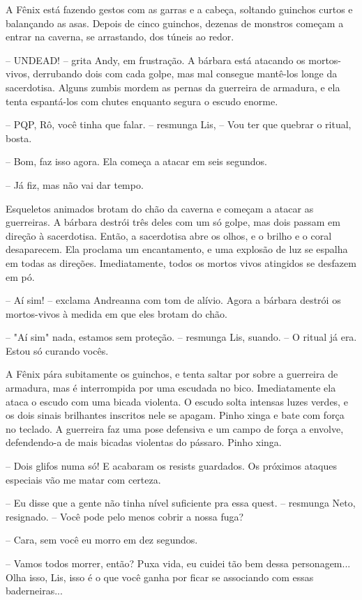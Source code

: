 A Fênix está fazendo gestos com as garras e a cabeça, soltando guinchos curtos e balançando as asas.
Depois de cinco guinchos, dezenas de monstros começam a entrar na caverna, se arrastando, dos túneis ao redor.

-- UNDEAD! -- grita Andy, em frustração. A bárbara está atacando os mortos-vivos, derrubando dois com cada golpe, 
mas mal consegue mantê-los longe da sacerdotisa. 
Alguns zumbis mordem as pernas da guerreira de armadura, e ela tenta espantá-los com chutes enquanto segura o escudo enorme.

-- PQP, Rô, você tinha que falar. -- resmunga Lis, -- Vou ter que quebrar o ritual, bosta.

-- Bom, faz isso agora. Ela começa a atacar em seis segundos.

-- Já fiz, mas não vai dar tempo.

Esqueletos animados brotam do chão da caverna e começam a atacar as guerreiras. A bárbara destrói três deles com um só golpe,
mas dois passam em direção à sacerdotisa. 
Então, a sacerdotisa abre os olhos, e o brilho e o coral
desaparecem. Ela proclama um encantamento, e uma explosão de luz se espalha em todas as direções. Imediatamente,
todos os mortos vivos atingidos se desfazem em pó.

-- Aí sim! -- exclama Andreanna com tom de alívio. Agora a bárbara destrói os mortos-vivos à medida em que eles brotam do chão.

-- "Aí sim" nada, estamos sem proteção. -- resmunga Lis, suando. -- O ritual já era. Estou só curando vocês.

A Fênix pára subitamente os guinchos, e tenta saltar por sobre a guerreira de armadura, mas é interrompida por uma escudada no bico.
Imediatamente ela ataca o escudo com uma bicada violenta. O escudo solta intensas luzes verdes, e os dois sinais
brilhantes inscritos nele se apagam. Pinho xinga e bate com força no teclado. A guerreira faz uma pose defensiva e um campo de força a envolve,
defendendo-a de mais bicadas violentas do pássaro. Pinho xinga.

-- Dois glifos numa só! E acabaram os resists guardados. Os próximos ataques especiais vão me matar com certeza.

-- Eu disse que a gente não tinha nível suficiente pra essa quest. -- resmunga Neto, resignado. -- Você pode pelo menos cobrir a nossa fuga?

-- Cara, sem você eu morro em dez segundos.

-- Vamos todos morrer, então? Puxa vida, eu cuidei tão bem dessa personagem... Olha isso, Lis, isso é o que você ganha por ficar se associando
com essas baderneiras...

